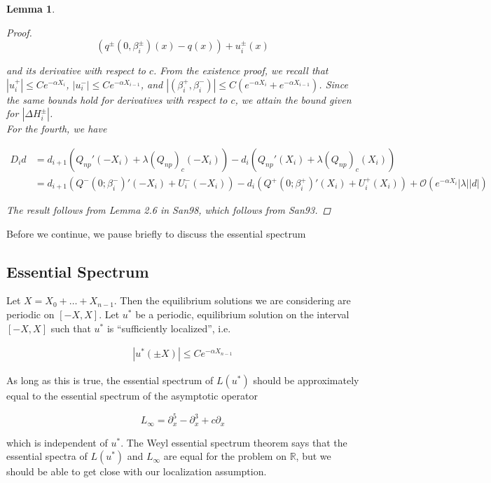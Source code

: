\documentclass[12pt]{article}
\def\R{{\mathbb R}}
\newtheorem{lemma}{Lemma}
\begin{document}
\begin{lemma}
\begin{proof}
\[
(q^\pm(0, \beta_i^\pm)(x) - q(x)) + u_i^\pm(x)
\]

and its derivative with respect to $c$. From the existence proof, we recall that $|u_i^+| \leq C e^{-\alpha X_i}$, $|u_i^-| \leq C e^{-\alpha X_{i-1}}$, and $|(\beta_i^+, \beta_i^-)| \leq C( e^{-\alpha X_i} + e^{-\alpha X_{i-1}})$. Since the same bounds hold for derivatives with respect to $c$, we attain the bound given for $|\Delta H_i^\pm|$.\\

For the fourth, we have

\begin{align*}
D_i d &= d_{i+1}(Q_{np}'(-X_i) + \lambda (Q_{np})_c(-X_i)) - d_i ( Q_{np}'(X_i) + \lambda (Q_{np})_c(X_i) ) \\
&= d_{i+1} (Q^-(0; \beta_i^-)'(-X_i) + U_i^-(-X_i)) - d_i (Q^+(0; \beta_i^+)'(X_i) + U_i^+(X_i)) + \mathcal{O}(e^{-\alpha X_i} |\lambda||d|)
\end{align*}

The result follows from Lemma 2.6 in San98, which follows from San93.

\end{proof}
\end{lemma}

Before we continue, we pause briefly to discuss the essential spectrum

\subsection{Essential Spectrum}

Let $X = X_0 + \dots + X_{n-1}$. Then the equilibrium solutions we are considering are periodic on $[-X, X]$. Let $u^*$ be a periodic, equilibrium solution on the interval $[-X, X]$ such that $u^*$ is ``sufficiently localized'', i.e.

\begin{align*}
|u^*(\pm X)| \leq C e^{-\alpha X_{n-1}}
\end{align*}

As long as this is true, the essential spectrum of $L(u^*)$ should be approximately equal to the essential spectrum of the asymptotic operator

\begin{equation}
L_\infty = \partial_x^5 - \partial_x^3 + c \partial_x
\end{equation}

which is independent of $u^*$. The Weyl essential spectrum theorem says that the essential spectra of $L(u^*)$ and $L_\infty$ are equal for the problem on $\R$, but we should be able to get close with our localization assumption.\\
\end{document}
